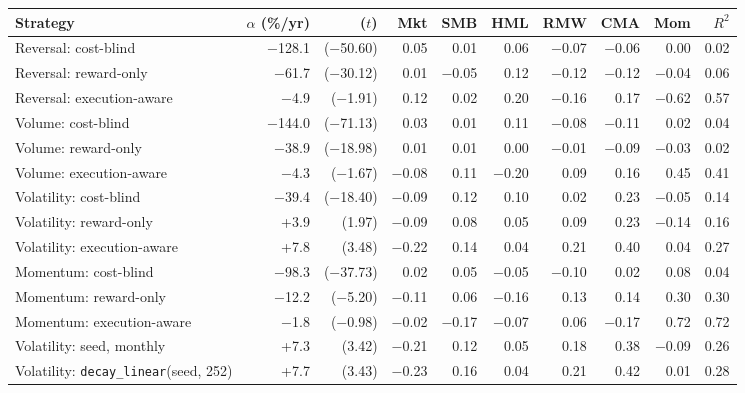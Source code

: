 \begin{tabular}{lrrrrrrrrr}
\toprule
Strategy & $\alpha$ (\%/yr) & ($t$) & Mkt & SMB & HML & RMW & CMA & Mom & $R^2$ \\
\midrule
Reversal: cost-blind & $-$128.1 & ($-$50.60) & 0.05 & 0.01 & 0.06 & $-$0.07 & $-$0.06 & 0.00 & 0.02 \\
Reversal: reward-only & $-$61.7 & ($-$30.12) & 0.01 & $-$0.05 & 0.12 & $-$0.12 & $-$0.12 & $-$0.04 & 0.06 \\
Reversal: execution-aware & $-$4.9 & ($-$1.91) & 0.12 & 0.02 & 0.20 & $-$0.16 & 0.17 & $-$0.62 & 0.57 \\
\addlinespace
Volume: cost-blind & $-$144.0 & ($-$71.13) & 0.03 & 0.01 & 0.11 & $-$0.08 & $-$0.11 & 0.02 & 0.04 \\
Volume: reward-only & $-$38.9 & ($-$18.98) & 0.01 & 0.01 & 0.00 & $-$0.01 & $-$0.09 & $-$0.03 & 0.02 \\
Volume: execution-aware & $-$4.3 & ($-$1.67) & $-$0.08 & 0.11 & $-$0.20 & 0.09 & 0.16 & 0.45 & 0.41 \\
\addlinespace
Volatility: cost-blind & $-$39.4 & ($-$18.40) & $-$0.09 & 0.12 & 0.10 & 0.02 & 0.23 & $-$0.05 & 0.14 \\
Volatility: reward-only & +3.9 & (1.97) & $-$0.09 & 0.08 & 0.05 & 0.09 & 0.23 & $-$0.14 & 0.16 \\
Volatility: execution-aware & +7.8 & (3.48) & $-$0.22 & 0.14 & 0.04 & 0.21 & 0.40 & 0.04 & 0.27 \\
\addlinespace
Momentum: cost-blind & $-$98.3 & ($-$37.73) & 0.02 & 0.05 & $-$0.05 & $-$0.10 & 0.02 & 0.08 & 0.04 \\
Momentum: reward-only & $-$12.2 & ($-$5.20) & $-$0.11 & 0.06 & $-$0.16 & 0.13 & 0.14 & 0.30 & 0.30 \\
Momentum: execution-aware & $-$1.8 & ($-$0.98) & $-$0.02 & $-$0.17 & $-$0.07 & 0.06 & $-$0.17 & 0.72 & 0.72 \\
\midrule
Volatility: seed, monthly & +7.3 & (3.42) & $-$0.21 & 0.12 & 0.05 & 0.18 & 0.38 & $-$0.09 & 0.26 \\
Volatility: \texttt{decay\_linear}(seed, 252) & +7.7 & (3.43) & $-$0.23 & 0.16 & 0.04 & 0.21 & 0.42 & 0.01 & 0.28 \\
\bottomrule
\end{tabular}
